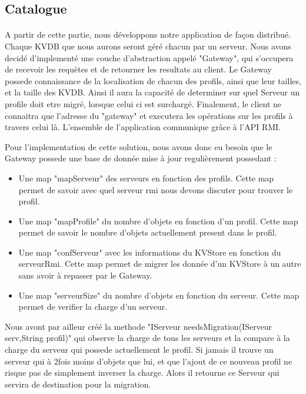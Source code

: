 \subsection{Catalogue}

\paragraph{}
A partir de cette partie, nous développons notre application de façon distribué. Chaque KVDB que nous aurons seront géré chacun par un serveur. Nous avons decidé d'implementé une couche d'abstraction appelé "Gateway", qui s'occupera de recevoir les requètes et de retourner les resultats au client. Le Gateway possede connaissance de la localisation de chacun des profils, ainsi que leur tailles, et la taille des KVDB. Ainsi il aura la capacité de determiner sur quel Serveur un profile doit etre migré, lorsque celui ci est surchargé.
Finalement, le client ne connaitra que l'adresse du "gateway" et executera les opérations sur les profils à travers celui là.
L'ensemble de l'application communique grâce à l'API RMI.

Pour l'implementation de cette solution, nous avons donc eu besoin que le Gateway possede une base de donnée mise à jour regulièrement possedant :
\begin{itemize}
\item Une map "mapServeur" des serveurs en fonction des profils. Cette map permet de savoir avec quel serveur rmi nous devons discuter pour trouver le profil.
\item Une map "mapProfile" du nombre d'objets en fonction d'un profil. Cette map permet de savoir le nombre d'objets actuellement present dans le profil.
\item Une map "confServeur" avec les informations du KVStore en fonction du serveurRmi. Cette map permet de migrer les donnée d'un KVStore à un autre sans avoir à repasser par le Gateway.
\item Une map "serveurSize" du nombre d'objets en fonction du serveur. Cette map permet de verifier la charge d'un serveur.
\end{itemize}

Nous avont par ailleur créé la methode "IServeur needsMigration(IServeur serv,String profil)" qui observe la charge de tous les serveurs et la compare à la charge du serveur qui possede actuellement le profil.
Si jamais il trouve un serveur qui à 2fois moins d'objets que lui, et que l'ajout de ce nouveau profil ne risque pas de simplement inverser la charge. Alors il retourne ce Serveur qui servira de destination pour la migration.

